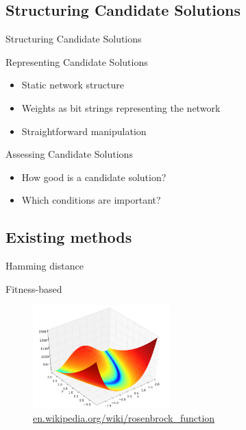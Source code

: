 \subsection{Structuring Candidate Solutions}

\begin{frame}{Structuring Candidate Solutions}
  \begin{center}
    
  \end{center}
\end{frame}

\begin{frame}{Representing Candidate Solutions}
  \begin{itemize}
    \item Static network structure
    \item Weights as bit strings representing the network
    \item Straightforward manipulation
  \end{itemize}
\end{frame}

\begin{frame}{Assessing Candidate Solutions}
  \begin{itemize}
    \item How good is a candidate solution?
    \item Which conditions are important?
  \end{itemize}
\end{frame}

\subsection{Existing methods}

\begin{frame}{Hamming distance}
  
\end{frame}

\begin{frame}{Fitness-based}
  \begin{figure}
    \centering
    \includegraphics[height=150px]{elias/images/elevation.png}
    \caption{\url{en.wikipedia.org/wiki/rosenbrock_function}}
  \end{figure}
\end{frame}

